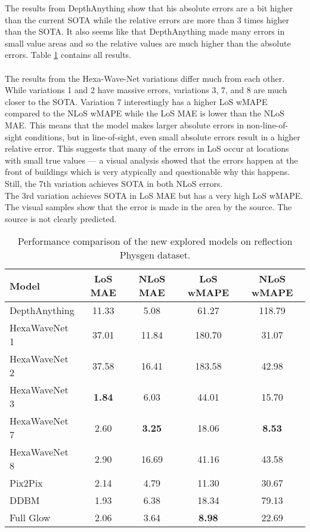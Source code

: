 		The results from DepthAnything show that his absolute errors are a bit higher than the current SOTA while the relative errors are more than 3 times higher than the SOTA. It also seems like that DepthAnything made many errors in small value areas and so the relative values are much higher than the absolute errors. Table \ref{tab:experiment_architecture_results} contains all results.\\
		\\
		The results from the Hexa-Wave-Net variations differ much from each other. While variations 1 and 2 have massive errors, variations 3, 7, and 8 are much closer to the SOTA. Variation 7 interestingly has a higher LoS wMAPE compared to the NLoS wMAPE while the LoS MAE is lower than the NLoS MAE. This means that the model makes larger absolute errors in non-line-of-sight conditions, but in line-of-sight, even small absolute errors result in a higher relative error. This suggests that many of the errors in LoS occur at locations with small true values — a visual analysis showed that the errors happen at the front of buildings which is very atypically and questionable why this happens. Still, the 7th variation achieves SOTA in both NLoS errors. \\
		The 3rd variation achieves SOTA in LoS MAE but has a very high LoS wMAPE. The visual samples show that the error is made in the area by the source. The source is not clearly predicted.
		
		\begin{table}[h!]
			\centering
			\begin{tabular}{|l|c|c|c|c|}
				\hline
				\textbf{Model} & \textbf{LoS MAE} & \textbf{NLoS MAE} & \textbf{LoS wMAPE} & \textbf{NLoS wMAPE} \\
				\hline
				DepthAnything & 11.33 & 5.08 & 61.27 & 118.79 \\
				HexaWaveNet 1 & 37.01 & 11.84 & 180.70 & 31.07 \\
				HexaWaveNet 2 & 37.58 & 16.41 & 183.58 & 42.98 \\
				HexaWaveNet 3 & \textbf{1.84} & 6.03 & 44.01 & 15.70 \\
				HexaWaveNet 7 & 2.60 & \textbf{3.25} & 18.06 & \textbf{8.53} \\
				HexaWaveNet 8 & 2.90 & 16.69 & 41.16 & 43.58 \\
				Pix2Pix & 2.14 & 4.79 & 11.30 & 30.67 \\
				DDBM & 1.93 & 6.38 & 18.34 & 79.13 \\
				Full Glow & 2.06 & 3.64 & \textbf{8.98} & 22.69 \\
				\hline
			\end{tabular}
			\caption{Performance comparison of the new explored models on reflection Physgen dataset.}
			\label{tab:experiment_architecture_results}
		\end{table}
		\FloatBarrier
		
